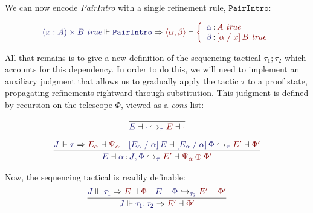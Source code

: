 \documentclass[11pt]{article}
\theoremstyle{definition}
\theoremstyle{remark}
\numberwithin{equation}{section}
\def\InputModeColorName{MidnightBlue}
\def\OutputModeColorName{Maroon}
\newcommand\InputMode[1]{{\color{\InputModeColorName}{#1}}}
\newcommand\OutputMode[1]{{\color{\OutputModeColorName}{#1}}}
\newcommand\JJ{J}
\newcommand\Tuple[1]{\left\langle#1\right\rangle}
\newcommand\ISG[2]{\InputMode{#1}\,{\color{Black}:}\,\InputMode{#2}}
\newcommand\OSG[2]{\InputMode{#1}\,{\color{Black}:}\,\OutputMode{#2}}
\newcommand\Refine[4]{\InputMode{#1}\Vdash\InputMode{#2}\Rightarrow\OutputMode{#4}\dashv\OutputMode{#3}}
\newcommand\ThenStateTrans[5]{%
  \InputMode{#2}\dashv\InputMode{#3}%
  \hookrightarrow_\InputMode{#1}%
  \OutputMode{#4}\dashv\OutputMode{#5}%
}
\newcommand\IsTrueUnmoded[1]{#1\ \textit{true}}
\newcommand\ThenTac[2]{#1;#2}
\newcommand\DProdIntroRuleNullary{\mathtt{PairIntro}}
\newcommand\TyDProd[3]{(#2:#1) \times #3}
\newcommand\Subst[3]{\left[#1\;/\;#2\right]#3}
\begin{document}
We can now encode \emph{PairIntro} with a single refinement rule,
$\DProdIntroRuleNullary$:

\[
  \Refine{\IsTrueUnmoded{\TyDProd{A}{x}{B}}}{\DProdIntroRuleNullary}{%
    \left\{\begin{array}{l}
        \OSG{\alpha}{\IsTrueUnmoded{A}}\\
        \OSG{\beta}{\IsTrueUnmoded{\Subst{\alpha}{x}{B}}}
    \end{array}\right.
  }{
    \Tuple{\alpha,\beta}
  }
\]

All that remains is to give a new definition of the sequencing tactical
$\ThenTac{\tau_1}{\tau_2}$ which accounts for this dependency. In order to do
this, we will need to implement an auxiliary judgment
\framebox{$\ThenStateTrans{\tau}{E}{\Phi}{E'}{\Phi'}$} that allows us to
gradually apply the tactic $\tau$ to a proof state, propagating refinements
rightward through substitution. This judgment is defined by recursion on the
telescope $\Phi$, viewed as a \emph{cons}-list:

\begin{gather*}
  \infer{
    \ThenStateTrans{\tau}{E}{\cdot}{E}{\cdot}
  }{
  }\\[6pt]
  \infer{
    \ThenStateTrans{\tau}{E}{\ISG{\alpha}{\JJ},\Phi}{E'}{\Psi_\alpha\oplus\Phi'}
  }{
    \Refine{\JJ}{\tau}{\Psi_\alpha}{E_\alpha} &
    \ThenStateTrans{\tau}{%
      \Subst{E_\alpha}{\alpha}{E}%
    }{
      \Subst{E_\alpha}{\alpha}{\Phi}
    }{E'}{\Phi'}
  }
\end{gather*}

Now, the sequencing tactical is readily definable:
\[
  \infer{
    \Refine{\JJ}{\ThenTac{\tau_1}{\tau_2}}{\Phi'}{E'}
  }{
    \Refine{\JJ}{\tau_1}{\Phi}{E} &
    \ThenStateTrans{\tau_2}{E}{\Phi}{E'}{\Phi'}
  }
\]
\end{document}
